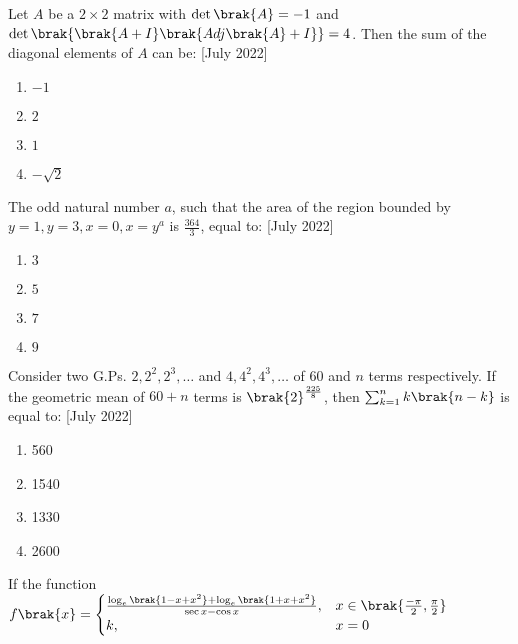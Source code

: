     \item Let $A$ be a $2 \times 2$ matrix with $\det\brak{A}= -1$ and $\det\brak{\brak{A+I}\brak{Adj\brak{A}+I}} = 4$. Then the sum of the diagonal elements of $A$ can be: \hfill{[July 2022]}
    \begin{multicols}{2}
        \begin{enumerate}
            \item $-1$
            \item $2$
            \item $1$
            \item $-\sqrt{2}$
            
        \end{enumerate}
    \end{multicols}
    \item The odd natural number $a$, such that the area of the region bounded by $y = 1,y=3,x=0,x=y^a$ is $\frac{364}{3}$, equal to: \hfill{[July 2022]}
    \begin{multicols}{2}
        \begin{enumerate}
            \item $3$
            \item $5$
            \item$7$
            \item $9$
        \end{enumerate}
    \end{multicols}
    \item Consider two G.Ps. $2,2^2,2^3,\dots$ and $4,4^2,4^3,\dots$ of $60$ and $n$ terms respectively. If the geometric mean of $60+n$ terms is $\brak{2}^\frac{225}{8}$, then $\sum_{k=1}^{n} k\brak{n-k}$ is equal to: \hfill{[July 2022]}
    \begin{multicols}{2}
        \begin{enumerate}
            \item 560
            \item 1540
            \item 1330
            \item 2600
        \end{enumerate}
    \end{multicols}
    \item If the function 
    $f\brak{x} = 
    \begin{cases}
        \frac{\log_e\brak{1-x+x^2}+\log_e\brak{1+x+x^2}}{\sec{x}-\cos{x}}, &x \in \brak{\frac{-\pi}{2},\frac{\pi}{2}} \\
    k        ,&x = 0
    \end{cases}$\\
